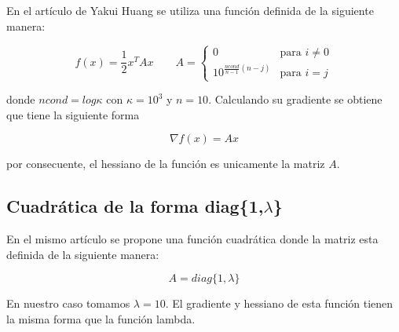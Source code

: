 En el artículo de Yakui Huang\cite{huang_2022_1} se utiliza una función definida de la siguiente manera:

\begin{equation*}
    f(x) = \frac{1}{2}x^TAx \qquad A=\begin{cases}
        0                           & \text{para } i\neq 0 \\
        10^{\frac{ncond}{n-1}(n-j)} & \text{para } i=j
    \end{cases}
\end{equation*}

donde $ncond=log \kappa$ con $\kappa = 10^3$ y $n=10$. Calculando su gradiente se obtiene que tiene la siguiente forma

\begin{equation*}
    \nabla f(x) = Ax
\end{equation*}

por consecuente, el hessiano de la función es unicamente la matriz $A$.

\subsection*{Cuadrática de la forma diag\{1,$\lambda$\}}

En el mismo artículo\cite{huang_2022_1} se propone una función cuadrática donde la matriz esta definida de la siguiente manera:

\begin{equation*}
    A = diag\{1,\lambda\}
\end{equation*}

En nuestro caso tomamos $\lambda=10$. El gradiente y hessiano de esta función tienen la misma forma que la función lambda.